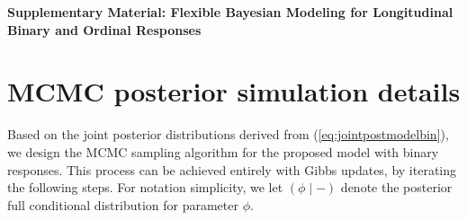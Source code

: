 \pagebreak
\begin{center}
\textbf{\Large Supplementary Material: Flexible Bayesian Modeling for Longitudinal Binary and Ordinal Responses}
\end{center}
\setcounter{equation}{0}
\setcounter{figure}{0}
\setcounter{table}{0}
\setcounter{page}{1}
\setcounter{section}{0}
\makeatletter
\renewcommand{\theequation}{S\arabic{equation}}
\renewcommand{\thefigure}{S\arabic{figure}}
\renewcommand{\thetable}{S\arabic{table}}
\renewcommand{\thesection}{S\arabic{section}}
\renewcommand{\bibnumfmt}[1]{[S#1]}
\renewcommand{\citenumfont}[1]{S#1}


\section{MCMC posterior simulation details}
\label{sec:smmcmcdetail}

Based on the joint posterior distributions derived from (\ref{eq:jointpostmodelbin}), we design the MCMC sampling algorithm for the proposed model with binary responses. This process can be achieved entirely with Gibbs updates, by iterating the following steps. For notation simplicity, we let $(\phi\mid -)$ denote the posterior full conditional distribution for parameter $\phi$. 

